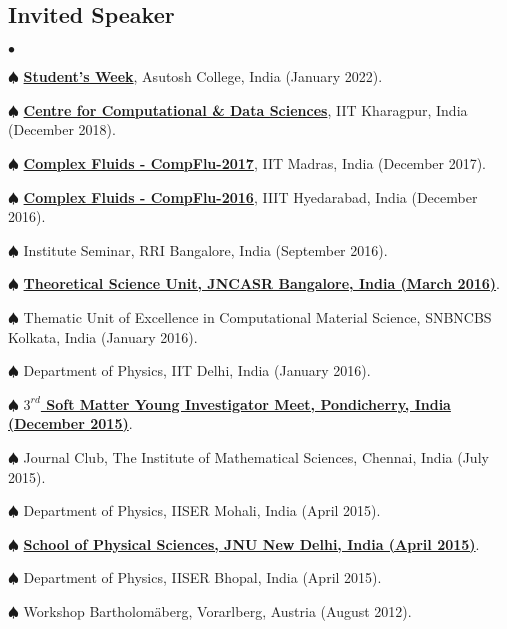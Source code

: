 \documentclass[margin,line]{res}
\newenvironment{list2}{
  \begin{list}{$\bullet$}{%
      \setlength{\itemsep}{0in}
      \setlength{\parsep}{0in} \setlength{\parskip}{0in}
      \setlength{\topsep}{0in} \setlength{\partopsep}{0in} 
      \setlength{\leftmargin}{0.2in}}}{\end{list}}
\begin{document}
\begin{resume}
\section{\sc Invited Speaker}
\begin{list2}
\item[$\spadesuit$] \href{https://www.slideshare.net/AmitBhattacharjee14/digital-blended-mode-of-education}{\bf Student's Week}, Asutosh  
      College, India (January 2022).
\item[$\spadesuit$] \href{https://www.slideshare.net/AmitBhattacharjee14/seminar-iitkgp}{\bf Centre for Computational \& Data Sciences}, IIT 
      Kharagpur, India (December 2018).
\item[$\spadesuit$] \href{https://www.slideshare.net/AmitBhattacharjee14/elecnem}{\bf Complex Fluids - CompFlu-2017}, IIT Madras, India (December 2017).
\item[$\spadesuit$] \href{http://www.slideshare.net/AmitBhattacharjee14/nucleating-nematic-droplets}{\bf Complex Fluids - CompFlu-2016}, IIIT Hyedarabad, 
      India (December 2016).
\item[$\spadesuit$] Institute Seminar, RRI Bangalore, India (September 2016). 
\item[$\spadesuit$] \href{http://www.jncasr.ac.in/tsumain.php/TSU-Home/1/1/}{\bf Theoretical Science Unit, JNCASR Bangalore, India (March 2016)}.
\item[$\spadesuit$] Thematic Unit of Excellence in Computational Material Science, SNBNCBS Kolkata, India (January 2016).
\item[$\spadesuit$] Department of Physics, IIT Delhi, India (January 2016).
\item[$\spadesuit$] \href{http://www.slideshare.net/AmitBhattacharjee14/tsu-seminar-jncasr-march-2016}{\bf $3^{rd}$ Soft Matter Young Investigator Meet, 
      Pondicherry, India (December 2015)}.
\item[$\spadesuit$] Journal Club, The Institute of Mathematical Sciences, Chennai, India (July 2015).
\item[$\spadesuit$] Department of Physics, IISER Mohali, India (April 2015).
\item[$\spadesuit$] \href{http://www.slideshare.net/AmitBhattacharjee14/particle-and-field-based-methods-for-complex-fluids-and-soft-materials}{\bf School 
      of Physical Sciences, JNU New Delhi, India (April 2015)}.
\item[$\spadesuit$] Department of Physics, IISER Bhopal, India (April 2015).
\item[$\spadesuit$] Workshop Bartholom\"{a}berg, Vorarlberg, Austria (August 2012).  

\end{list2}
\end{resume}
\end{document}
